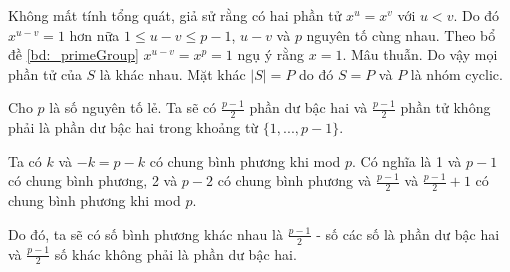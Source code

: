 \documentclass[../main.tex]{subfiles}
\begin{document}
Không mất tính tổng quát, giả sử rằng có hai phần tử $x^u = x^v$ với $u<v$. Do đó $x^{u-v} =1$ hơn nữa $1 \leq u-v \leq p-1$, $u-v$ và $p$ nguyên tố cùng nhau. Theo bổ đề \ref{bd:_primeGroup} $x^{u-v} = x^p = 1$ ngụ ý rằng $x=1$. Mâu thuẫn. Do vậy mọi phần tử của $S$ là khác nhau. Mặt khác $|S| = P$ do đó $S = P$ và $P$ là nhóm cyclic.

\begin{bd}
\label{bd:quadraticResidue}
Cho $p$ là số nguyên tố lẻ. Ta sẽ có $\frac{p-1}{2}$ phần dư bậc hai và $\frac{p-1}{2}$ phần tử không phải là phần dư bậc hai trong khoảng từ $\{1,...,p-1\}$.
\end{bd}
Ta có $k$ và $-k = p - k$ có chung bình phương khi mod $p$. Có nghĩa là 1 và $p-1$ có chung bình phương, 2 và $p-2$ có chung bình phương và $\frac{p-1}{2}$ và $\frac{p-1}{2}+1$ có chung bình phương khi mod $p$.

Do đó, ta sẽ có số bình phương khác nhau là $\frac{p-1}{2}$ - số các số là phần dư bậc hai và $\frac{p-1}{2}$ số khác không phải là phần dư bậc hai. 
\end{document}
